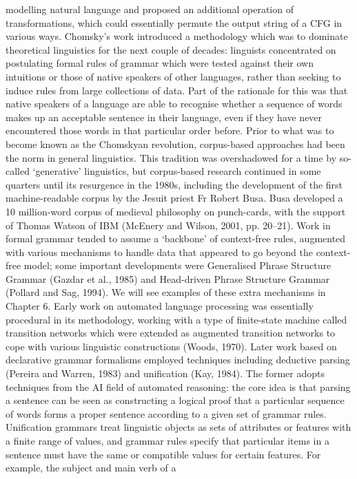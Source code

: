 modelling natural language and proposed an additional operation of
transformations, which could essentially permute the output string of a CFG in
various ways. Chomsky’s work introduced a methodology which was to dominate
theoretical linguistics for the next couple of decades: linguists concentrated on
postulating formal rules of grammar which were tested against their own intuitions
or those of native speakers of other languages, rather than seeking to induce rules
from large collections of data. Part of the rationale for this was that native speakers
of a language are able to recognise whether a sequence of words makes up an
acceptable sentence in their language, even if they have never encountered those
words in that particular order before. Prior to what was to become known as the
Chomskyan revolution, corpus-based approaches had been the norm in general
linguistics. This tradition was overshadowed for a time by so-called ‘generative’
linguistics, but corpus-based research continued in some quarters until its resurgence
in the 1980s, including the development of the first machine-readable corpus by the
Jesuit priest Fr Robert Busa. Busa developed a 10 million-word corpus of medieval
philosophy on punch-cards, with the support of Thomas Watson of IBM (McEnery
and Wilson, 2001, pp. 20–21).
Work in formal grammar tended to assume a ‘backbone’ of context-free rules,
augmented with various mechanisms to handle data that appeared to go beyond the
context-free model; some important developments were Generalised Phrase
Structure Grammar (Gazdar et al., 1985) and Head-driven Phrase Structure
Grammar (Pollard and Sag, 1994). We will see examples of these extra mechanisms
in Chapter 6.
Early work on automated language processing was essentially procedural in its
methodology, working with a type of finite-state machine called transition
networks which were extended as augmented transition networks to cope with
various linguistic constructions (Woods, 1970). Later work based on declarative
grammar formalisms employed techniques including deductive parsing (Pereira and
Warren, 1983) and unification (Kay, 1984). The former adopts techniques from the
AI field of automated reasoning: the core idea is that parsing a sentence can be seen
as constructing a logical proof that a particular sequence of words forms a proper
sentence according to a given set of grammar rules. Unification grammars treat
linguistic objects as sets of attributes or features with a finite range of values, and
grammar rules specify that particular items in a sentence must have the same or
compatible values for certain features. For example, the subject and main verb of a
